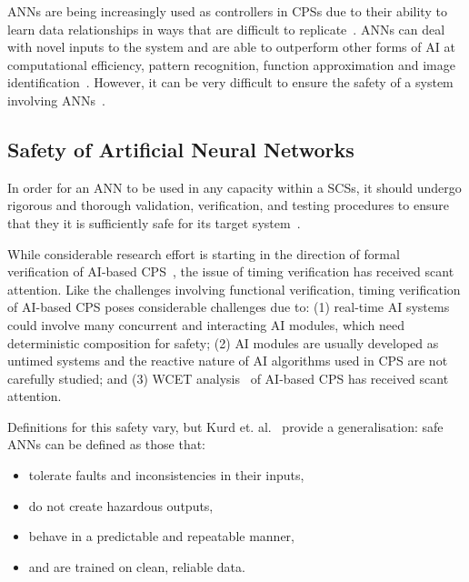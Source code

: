 \acp{ANN} are being increasingly used as controllers in \acp{CPS} due to their ability to learn data relationships in ways that are difficult to replicate~\cite{ANNSafety2007}. 
\acp{ANN} can deal with novel inputs to the system and are able to outperform other forms of \ac{AI} at computational efficiency, pattern recognition, function approximation and image identification~\cite{AIComp2016, AIComp2017}. 
However, it can be very difficult to ensure the safety of a system involving \acp{ANN}~\cite{ANNSafety2007, ANNSafety2018}.

\subsection{Safety of Artificial Neural Networks}
In order for an \ac{ANN} to be used in any capacity within a \acp{SCS}, it should undergo rigorous and thorough validation, verification, and testing procedures to ensure that they it is sufficiently safe for its target system~\cite{scann, ANNSafetyLifecycle2003}. 

While considerable research effort is starting in the direction of formal verification of \ac{AI}-based \ac{CPS}~\cite{seshia2016towards, russell2015}, the issue of timing verification has received scant attention. 
Like the challenges involving functional verification, timing verification of AI-based  \ac{CPS} poses considerable challenges due to: (1) real-time \ac{AI} systems could involve many concurrent and interacting \ac{AI} modules, which need deterministic composition for safety; (2) \ac{AI} modules are usually developed as untimed systems and the reactive nature of AI algorithms used in CPS are not carefully studied; and (3) \acf{WCET} analysis~\cite{wilhelm2008worst} of \ac{AI}-based \ac{CPS} has received scant attention.

Definitions for this safety vary, but Kurd et. al.~\cite{EstSafeCriteria2003} provide a generalisation: safe \acp{ANN} can be defined as those that:
\begin{itemize}
	\item tolerate faults and inconsistencies in their inputs,
	\item do not create hazardous outputs,
	\item behave in a predictable and repeatable manner,
	\item and are trained on clean, reliable data. 
\end{itemize}

